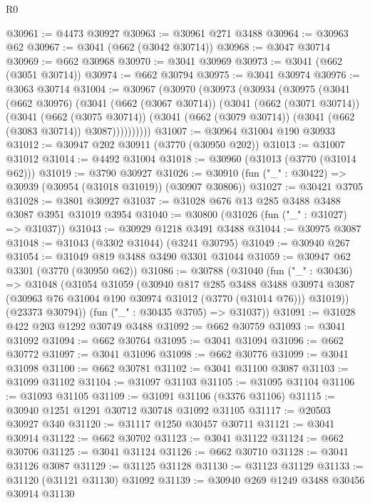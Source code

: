 \begin{lexlean}{R0}
\begin{coremodule}
@30961 := @4473 @30927
@30963 := @30961 @271 @3488
@30964 := @30963 @62
@30967 := @3041 (@662 (@3042 @30714))
@30968 := @3047 @30714
@30969 := @662 @30968
@30970 := @3041 @30969
@30973 := @3041 (@662 (@3051 @30714))
@30974 := @662 @30794
@30975 := @3041 @30974
@30976 := @3063 @30714
@31004 := @30967
    (@30970
      (@30973
        (@30934
          (@30975
            (@3041
              (@662 @30976)
              (@3041
                (@662 (@3067 @30714))
                (@3041
                  (@662 (@3071 @30714))
                  (@3041
                    (@662 (@3075 @30714))
                    (@3041 (@662 (@3079 @30714)) (@3041 (@662 (@3083 @30714)) @3087))))))))))
@31007 := @30964 @31004 @190 @30933
@31012 := @30947 @202 @30911 (@3770 (@30950 @202))
@31013 := @31007 @31012
@31014 := @4492 @31004
@31018 := @30960 (@31013 (@3770 (@31014 @62)))
@31019 := @3790 @30927
@31026 := @30910 (fun ("_" : @30422) => @30939 (@30954 (@31018 @31019)) (@30907 @30806))
@31027 := @30421 @3705
@31028 := @3801 @30927
@31037 := @31028 @676 @13 @285 @3488 @3488 @3087 @3951 @31019 @3954
@31040 := @30800 (@31026 (fun ("_" : @31027) => @31037))
@31043 := @30929 @1218 @3491 @3488
@31044 := @30975 @3087
@31048 := @31043 (@3302 @31044) (@3241 @30795)
@31049 := @30940 @267
@31054 := @31049 @819 @3488 @3490 @3301 @31044
@31059 := @30947 @62 @3301 (@3770 (@30950 @62))
@31086 := @30788
    (@31040
      (fun ("_" : @30436) =>
      @31048
        (@31054
          @31059
          (@30940
            @817
            @285
            @3488
            @3488
            @30974
            @3087
            (@30963 @76 @31004 @190 @30974 @31012 (@3770 (@31014 @76)))
            @31019))
        (@23373 @30794))
      (fun ("_" : @30435 @3705) => @31037))
@31091 := @31028 @422 @203 @1292 @30749 @3488
@31092 := @662 @30759
@31093 := @3041 @31092
@31094 := @662 @30764
@31095 := @3041 @31094
@31096 := @662 @30772
@31097 := @3041 @31096
@31098 := @662 @30776
@31099 := @3041 @31098
@31100 := @662 @30781
@31102 := @3041 @31100 @3087
@31103 := @31099 @31102
@31104 := @31097 @31103
@31105 := @31095 @31104
@31106 := @31093 @31105
@31109 := @31091 @31106 (@3376 @31106)
@31115 := @30940 @1251 @1291 @30712 @30748 @31092 @31105
@31117 := @20503 @30927 @340
@31120 := @31117 @1250 @30457 @30711
@31121 := @3041 @30914
@31122 := @662 @30702
@31123 := @3041 @31122
@31124 := @662 @30706
@31125 := @3041 @31124
@31126 := @662 @30710
@31128 := @3041 @31126 @3087
@31129 := @31125 @31128
@31130 := @31123 @31129
@31133 := @31120 (@31121 @31130) @31092
@31139 := @30940 @269 @1249 @3488 @30456 @30914 @31130

\end{coremodule}
\end{lexlean}
